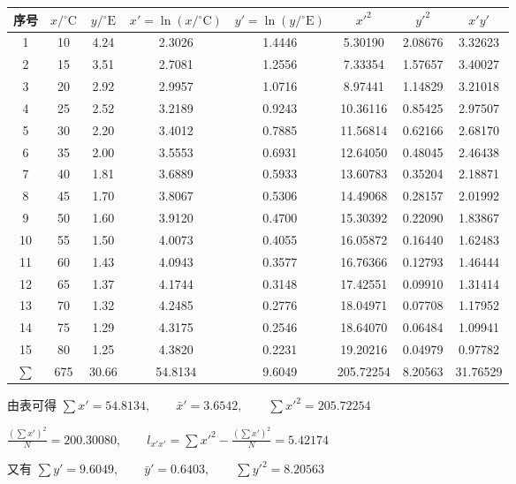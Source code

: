 \documentclass[UTF8,zihao=-4]{ctexart}
\begin{document}
\begin{center}
\scriptsize
\setlength{\tabcolsep}{4pt}
\begin{tabular}{c|c|c|c|c|c|c|c}
\toprule
序号 & $x/{}^\circ\mathrm{C}$ & $y/{}^\circ\mathrm{E}$ & $x'=\ln(x/{}^\circ\mathrm{C})$ & $y'=\ln(y/{}^\circ\mathrm{E})$ & $x'^2$ & $y'^2$ & $x'y'$\\
\midrule
1  & 10 & 4.24 & 2.3026 & 1.4446 & 5.30190 & 2.08676 & 3.32623\\
2  & 15 & 3.51 & 2.7081 & 1.2556 & 7.33354 & 1.57657 & 3.40027\\
3  & 20 & 2.92 & 2.9957 & 1.0716 & 8.97441 & 1.14829 & 3.21018\\
4  & 25 & 2.52 & 3.2189 & 0.9243 & 10.36116 & 0.85425 & 2.97507\\
5  & 30 & 2.20 & 3.4012 & 0.7885 & 11.56814 & 0.62166 & 2.68170\\
6  & 35 & 2.00 & 3.5553 & 0.6931 & 12.64050 & 0.48045 & 2.46438\\
7  & 40 & 1.81 & 3.6889 & 0.5933 & 13.60783 & 0.35204 & 2.18871\\
8  & 45 & 1.70 & 3.8067 & 0.5306 & 14.49068 & 0.28157 & 2.01992\\
9  & 50 & 1.60 & 3.9120 & 0.4700 & 15.30392 & 0.22090 & 1.83867\\
10 & 55 & 1.50 & 4.0073 & 0.4055 & 16.05872 & 0.16440 & 1.62483\\
11 & 60 & 1.43 & 4.0943 & 0.3577 & 16.76366 & 0.12793 & 1.46444\\
12 & 65 & 1.37 & 4.1744 & 0.3148 & 17.42551 & 0.09910 & 1.31414\\
13 & 70 & 1.32 & 4.2485 & 0.2776 & 18.04971 & 0.07708 & 1.17952\\
14 & 75 & 1.29 & 4.3175 & 0.2546 & 18.64070 & 0.06484 & 1.09941\\
15 & 80 & 1.25 & 4.3820 & 0.2231 & 19.20216 & 0.04979 & 0.97782\\
\midrule
$\sum$ & 675 & 30.66 & 54.8134 & 9.6049 & 205.72254 & 8.20563 & 31.76529\\
\bottomrule
\end{tabular}
\end{center}

由表可得 $\sum x'=54.8134, \qquad \bar{x}'=3.6542, \qquad \sum x'^2=205.72254$

$\frac{(\sum x')^2}{N}=200.30080, \qquad l_{x'x'}=\sum x'^2-\frac{(\sum x')^2}{N}=5.42174$

又有 $\sum y'=9.6049, \qquad \bar{y}'=0.6403, \qquad \sum y'^2=8.20563$
\end{document}
